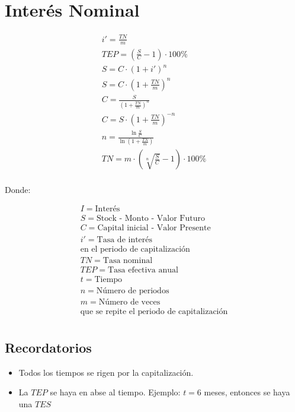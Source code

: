 \documentclass[a4paper, twocolumn]{article}
\begin{document}
\section{Interés Nominal}


\begin{gather*}
    i' = \frac{TN}{m} \\
    TEP = (\frac{S}{C} - 1) \cdot 100 \% \\
    S = C \cdot (1 + i')^n \\
    S = C \cdot (1 + \frac{TN}{m})^n \\
    C = \frac{S}{(1 + \frac{TN}{m})^n} \\
    C = S \cdot {(1 + \frac{TN}{m})^{-n}} \\
    n = \frac{\ln{\frac{S}{C}}}{\ln{(1 + \frac{TN}{m})}} \\
    TN = m \cdot (\sqrt[n]{\frac{S}{C}} - 1) \cdot 100 \% \\
\end{gather*}

Donde:

\begin{align*}
    I = \text{Interés}                                \\
    S = \text{Stock - Monto - Valor Futuro}           \\
    C = \text{Capital inicial - Valor Presente}       \\
    i' = \text{Tasa de interés}                       \\
    \text{en el periodo de capitalización}            \\
    TN = \text{Tasa nominal}                          \\
    TEP = \text{Tasa efectiva anual}                  \\
    t = \text{Tiempo}                                 \\
    n = \text{Número de periodos}                     \\
    m = \text{Número de veces}                        \\
    \text{que se repite el periodo de capitalización} \\
\end{align*}

\subsection{Recordatorios}

\begin{itemize}
    \item Todos los tiempos se rigen por la capitalización.
    \item La $TEP$ se haya en abse al tiempo.
          Ejemplo: $t = 6$ meses, entonces se haya una $TES$
\end{itemize}
\end{document}
